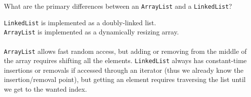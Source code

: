 What are the primary differences between an \texttt{ArrayList} and a \texttt{LinkedList}?

\begin{answer}
\texttt{LinkedList} is implemented as a doubly-linked list.
\\\texttt{ArrayList} is implemented as a dynamically resizing array.
\\ \\\texttt{ArrayList} allows fast random access, but adding or removing from the middle of the array
requires shifting all the elements. \texttt{LinkedList} always has constant-time insertions or removals
if accessed through an iterator (thus we already know the insertion/removal point), but getting
an element requires traversing the list until we get to the wanted index.
\end{answer}
	
\vspace{24pt}